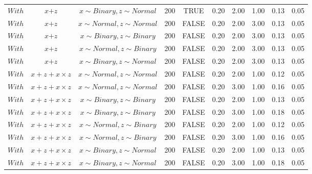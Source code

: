 \begin{longtable}{lccccccccc}
  $With$ & $\textit{x} + \textit{z}$ & $\textit{x} \sim Binary, \textit{z} \sim Normal$ & 200 & TRUE & 0.20 & 2.00 & 1.00 & 0.13 & 0.05 \\ 
  $With$ & $\textit{x} + \textit{z}$ & $\textit{x} \sim Normal , \textit{z} \sim Normal$ & 200 & FALSE & 0.20 & 2.00 & 3.00 & 0.13 & 0.05 \\ 
  $With$ & $\textit{x} + \textit{z}$ & $\textit{x} \sim Binary, \textit{z} \sim Binary$ & 200 & FALSE & 0.20 & 2.00 & 3.00 & 0.13 & 0.05 \\ 
  $With$ & $\textit{x} + \textit{z}$ & $\textit{x} \sim Normal, \textit{z} \sim Binary$ & 200 & FALSE & 0.20 & 2.00 & 3.00 & 0.13 & 0.05 \\ 
  $With$ & $\textit{x} + \textit{z}$ & $\textit{x} \sim Binary, \textit{z} \sim Normal$ & 200 & FALSE & 0.20 & 2.00 & 3.00 & 0.13 & 0.05 \\ 
  $With$ & $\textit{x} + \textit{z} + \textit{x} \times \textit{z}$ & $\textit{x} \sim Normal , \textit{z} \sim Normal$ & 200 & FALSE & 0.20 & 2.00 & 1.00 & 0.12 & 0.05 \\ 
  $With$ & $\textit{x} + \textit{z} + \textit{x} \times \textit{z}$ & $\textit{x} \sim Normal , \textit{z} \sim Normal$ & 200 & FALSE & 0.20 & 3.00 & 1.00 & 0.16 & 0.05 \\ 
  $With$ & $\textit{x} + \textit{z} + \textit{x} \times \textit{z}$ & $\textit{x} \sim Binary, \textit{z} \sim Binary$ & 200 & FALSE & 0.20 & 2.00 & 1.00 & 0.13 & 0.05 \\ 
  $With$ & $\textit{x} + \textit{z} + \textit{x} \times \textit{z}$ & $\textit{x} \sim Binary, \textit{z} \sim Binary$ & 200 & FALSE & 0.20 & 3.00 & 1.00 & 0.18 & 0.05 \\ 
  $With$ & $\textit{x} + \textit{z} + \textit{x} \times \textit{z}$ & $\textit{x} \sim Normal, \textit{z} \sim Binary$ & 200 & FALSE & 0.20 & 2.00 & 1.00 & 0.12 & 0.05 \\ 
  $With$ & $\textit{x} + \textit{z} + \textit{x} \times \textit{z}$ & $\textit{x} \sim Normal, \textit{z} \sim Binary$ & 200 & FALSE & 0.20 & 3.00 & 1.00 & 0.16 & 0.05 \\ 
  $With$ & $\textit{x} + \textit{z} + \textit{x} \times \textit{z}$ & $\textit{x} \sim Binary, \textit{z} \sim Normal$ & 200 & FALSE & 0.20 & 2.00 & 1.00 & 0.13 & 0.05 \\ 
  $With$ & $\textit{x} + \textit{z} + \textit{x} \times \textit{z}$ & $\textit{x} \sim Binary, \textit{z} \sim Normal$ & 200 & FALSE & 0.20 & 3.00 & 1.00 & 0.18 & 0.05 \\ 

\end{longtable}
